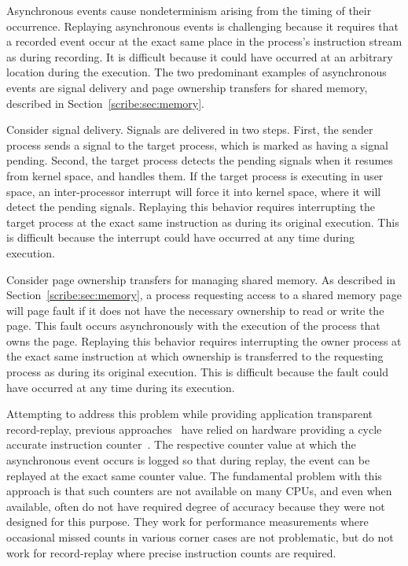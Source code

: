 \begin{table}[]
\begin{figure}[t]
  \label{scribe:fig:recasync}
\end{figure}

Asynchronous events cause nondeterminism arising from the timing of
their occurrence.  Replaying asynchronous events is challenging
because it requires that a recorded event occur at the exact same
place in the process's instruction stream as during recording. It is
difficult because it could have occurred at an arbitrary location
during the execution. The two predominant examples of asynchronous
events are signal delivery and page ownership transfers for shared
memory, described in Section~\ref{scribe:sec:memory}.

Consider signal delivery.  Signals are delivered in two steps.  First,
the sender process sends a signal to the target process, which is
marked as having a signal pending.  Second, the target process detects
the pending signals when it resumes from kernel space, and handles
them.  If the target process is executing in user space, an
inter-processor interrupt will force it into kernel space, where it 
will detect the pending signals.  Replaying this behavior requires
interrupting the target process at the exact same instruction as
during its original execution.  This is difficult because the
interrupt could have occurred at any time during execution.

Consider page ownership transfers for managing shared memory.  As
described in Section~\ref{scribe:sec:memory}, a process requesting access to
a shared memory page will page fault if it does not have the necessary
ownership to read or write the page.  This fault occurs asynchronously
with the execution of the process that owns the page.  Replaying this
behavior requires interrupting the owner process at the exact same
instruction at which ownership is transferred to the requesting
process as during its original execution.  This is difficult because
the fault could have occurred at any time during its execution.

Attempting to address this problem while providing application
transparent record-replay, previous
approaches~\cite{bressoud-tft,bressoud,revirt,smp-revirt} 
have relied on hardware providing a cycle accurate instruction
counter~\cite{slye96}.  The respective counter value at which the
asynchronous event occurs is logged so that during replay, the event
can be replayed at the exact same counter value.  The fundamental
problem with this approach is that such counters are not available on
many CPUs, and even when available, often do not have required degree
of accuracy because they were not designed for this purpose.  They
work for performance measurements where occasional missed counts in
various corner cases are not problematic, but do not work for
record-replay where precise instruction counts are required. 


\end{table}
